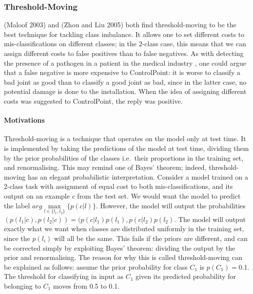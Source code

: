 \documentclass[a4paper,11pt]{article}
\begin{document}
\subsubsection{Threshold-Moving}

(Maloof 2003) and (Zhou and Liu 2005) both find threshold-moving to be the best technique for tackling class imbalance. It allows one to set different costs to mis-classifications on different classes; in the 2-class case, this means that we can assign different costs to false positives than to false negatives. As with detecting the presence of a pathogen in a patient in the medical industry \cite{imbalance}, one could argue that a false negative is more expensive to ControlPoint: it is worse to classify a bad joint as good than to classify a good joint as bad, since in the latter case, no potential damage is done to the installation. When the idea of assigning different costs was suggested to ControlPoint, the reply was positive. \\

\paragraph{Motivations}
Threshold-moving is a technique that operates on the model only at test time. It is implemented by taking the predictions of the model at test time, dividing them by the prior probabilities of the classes i.e.\ their proportions in the training set, and renormalising. This may remind one of Bayes' theorem; indeed, threshold-moving has an elegant probabilistic interpretation. Consider a model trained on a 2-class task with assignment of equal cost to both mis-classifications, and its output on an example $c$ from the test set. We would want the model to predict the label $arg\max\limits_{l \in \{l_1,l_2\}} \{p(c | l)\}$. However, the model will output the probabilities $(p(l_1 | c), p(l_2 | c)) = (p(c | l_1) p(l_1), p(c | l_2) p(l_2)$.
The model will output exactly what we want when classes are distributed uniformly in the training set, since the $p(l_i)$ will all be the same. This fails if the priors are different, and can be corrected simply by exploiting Bayes' theorem: dividing the output by the prior and renormalising. The reason for why this is called threshold-moving can be explained as follows: assume the prior probability for class $C_1$ is $p(C_1)=0.1$. The threshold for classifying in input as $C_1$ given its predicted probability for belonging to $C_1$ moves from 0.5 to 0.1. \\
\end{document}
